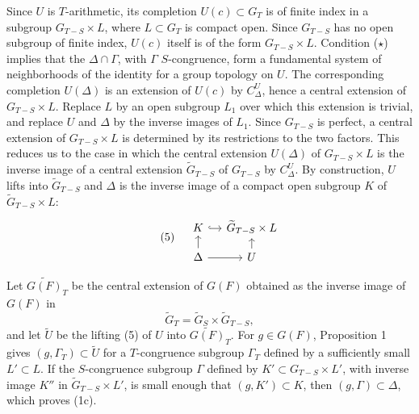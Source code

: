 \documentclass[10pt]{amsart}
\theoremstyle{plain}
\theoremstyle{definition}
\begin{document}
Since $U$ is $T$-arithmetic, its completion $U(c)\subset G_T$ is of finite index in a subgroup $G_{T-S}\times L$, where $L\subset G_T$ is compact open. Since $G_{T-S}$ has no open subgroup of finite index, $U(c)$ itself is of the form $G_{T-S}\times L$. Condition ($\star$) implies that the $\Delta\cap\Gamma$, with $\Gamma$ $S$-congruence, form a fundamental system of neighborhoods of the identity for a group topology on $U$. The corresponding completion $U(\Delta)$ is an extension of $U(c)$ by $C^U_\Delta$, hence a central extension of $G_{T-S}\times L$. Replace $L$ by an open subgroup $L_1$ over which this extension is trivial, and replace $U$ and $\Delta$ by the inverse images of $L_1$. Since $G_{T-S}$ is perfect, a central extension of $G_{T-S}\times L$ is determined by its restrictions to the two factors. This reduces us to the case in which the central extension $U(\Delta)$ of $G_{T-S}\times L$ is the inverse image of a central extension $\widetilde G_{T-S}$ of $G_{T-S}$ by $C^U_\Delta$. By construction, $U$ lifts into $\widetilde G_{T-S}$ and $\Delta$ is the inverse image of a compact open subgroup $K$ of $\widetilde G_{T-S}\times L$:
\begin{equation}\tag{5}
\begin{tikzcd}[column sep=small, row sep=small]
& K \arrow[r, hook] & \widetilde G_{T-S}\times L \\
& \Delta \arrow[u] \arrow[r] & U \arrow[u]
\end{tikzcd}
\end{equation}

Let $\widetilde{G(F)}_T$ be the central extension of $G(F)$ obtained as the inverse image of $G(F)$ in
\[
\widetilde G_T=\widetilde G_S\times\widetilde G_{T-S},
\]
and let $\widetilde U$ be the lifting (5) of $U$ into $\widetilde{G(F)}_T$. For $g\in G(F)$, Proposition 1 gives $(g,\Gamma_T)\subset\widetilde U$ for a $T$-congruence subgroup $\Gamma_T$ defined by a sufficiently small $L'\subset L$. If the $S$-congruence subgroup $\Gamma$ defined by $K'\subset G_{T-S}\times L'$, with inverse image $K''$ in $\widetilde G_{T-S}\times L'$, is small enough that $(g,K')\subset K$, then $(g,\Gamma)\subset\Delta$, which proves (1c).
\end{document}
